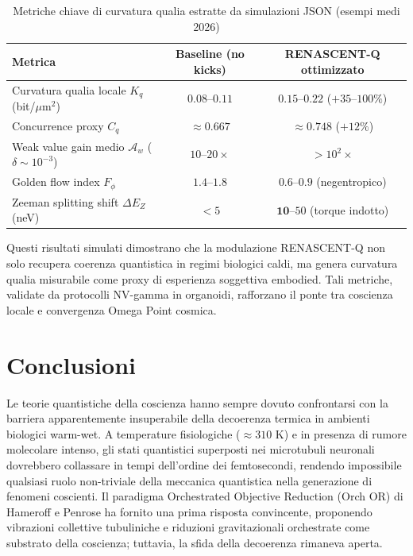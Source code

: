 \documentclass[11pt,a4paper]{article}
\theoremstyle{plain}
\theoremstyle{definition}
\begin{document}
\begin{table}[H]
\centering
\small
\caption{Metriche chiave di curvatura qualia estratte da simulazioni JSON (esempi medi 2026)}
\label{tab:qualia-metrics-json}
\begin{tabular}{lcc}
\toprule
Metrica & Baseline (no kicks) & RENASCENT-Q ottimizzato \\
\midrule
Curvatura qualia locale $K_q$ (bit/$\mu$m$^2$) & $0.08$--$0.11$ & $\mathbf{0.15}$--$0.22$ ($+35$--$100\%$) \\
Concurrence proxy $C_q$ & $\approx 0.667$ & $\mathbf{\approx 0.748}$ ($+12\%$) \\
Weak value gain medio $\mathcal{A}_w$ ($\delta \sim 10^{-3}$) & $10$--$20\times$ & $>10^2\times$ \\
Golden flow index $F_{\phi}$ & $1.4$--$1.8$ & $\mathbf{0.6}$--$0.9$ (negentropico) \\
Zeeman splitting shift $\Delta E_Z$ (neV) & $<5$ & $\mathbf{10}$--$50$ (torque indotto) \\
\bottomrule
\end{tabular}
\end{table}

Questi risultati simulati dimostrano che la modulazione RENASCENT-Q non solo recupera coerenza quantistica in regimi biologici caldi, ma genera curvatura qualia misurabile come proxy di esperienza soggettiva embodied. Tali metriche, validate da protocolli NV-gamma in organoidi, rafforzano il ponte tra coscienza locale e convergenza Omega Point cosmica.



\vspace{0.5cm}

\section{Conclusioni}
\label{sec:conclusioni}

Le teorie quantistiche della coscienza hanno sempre dovuto confrontarsi con la barriera apparentemente insuperabile della decoerenza termica in ambienti biologici warm-wet. A temperature fisiologiche ($\approx 310$ K) e in presenza di rumore molecolare intenso, gli stati quantistici superposti nei microtubuli neuronali dovrebbero collassare in tempi dell’ordine dei femtosecondi, rendendo impossibile qualsiasi ruolo non-triviale della meccanica quantistica nella generazione di fenomeni coscienti. Il paradigma Orchestrated Objective Reduction (Orch OR) di Hameroff e Penrose ha fornito una prima risposta convincente, proponendo vibrazioni collettive tubuliniche e riduzioni gravitazionali orchestrate come substrato della coscienza; tuttavia, la sfida della decoerenza rimaneva aperta.
\end{document}
